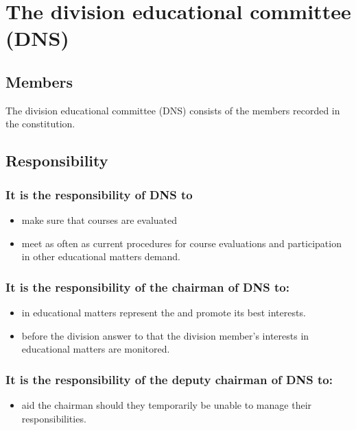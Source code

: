 \section{The division educational committee (DNS)}

\subsection{Members}
The division educational committee (DNS) consists of the members recorded in the constitution. 

\subsection{Responsibility}
\subsubsection{It is the responsibility of DNS to}
\begin{itemize}
  \item make sure that courses are evaluated
  \item meet as often as current procedures for course evaluations and participation in other educational matters demand. 
\end{itemize}

\subsubsection{It is the responsibility of the chairman of DNS to:}
\begin{itemize}
  \item in educational matters represent the \sdocsae and promote its best interests. 
  \item before the division answer to that the division member's interests in educational matters are monitored. 
\end{itemize}

\subsubsection{It is the responsibility of the deputy chairman of DNS to:}
\begin{itemize}
  \item aid the chairman should they temporarily be unable to manage their responsibilities.
\end{itemize}

\newpage
